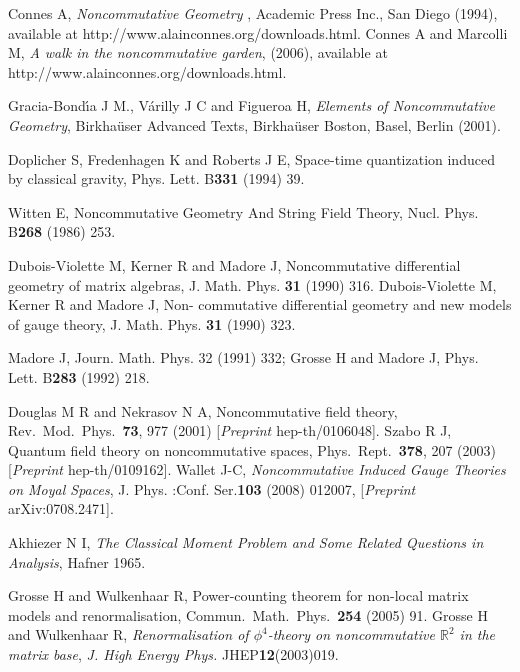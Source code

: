 \documentclass[a4paper,11pt,twoside]{article}
\numberwithin{equation}{section}
\theoremstyle{nonumberplain}
\begin{document}

\begin{thebibliography}{50} 

 Connes A, {\it{Noncommutative Geometry}} , Academic Press Inc., San Diego (1994), available at
http://www.alainconnes.org/downloads.html. Connes A and Marcolli M, {\it{A walk in the noncommutative garden}}, (2006), available at http://www.alainconnes.org/downloads.html.

 Gracia-Bond{\'\i}a J M., V{\'a}rilly J C and Figueroa H, {\it{Elements of Noncommutative Geometry}}, Birkha\"user Advanced Texts, Birkha\"user Boston, Basel, Berlin (2001).

 Doplicher S, Fredenhagen K and Roberts J E, {{Space-time quantization induced by classical gravity}}, Phys. Lett. B{\bf{331}} (1994) 39.

 Witten E, {{Noncommutative Geometry And String Field Theory}}, Nucl. Phys. B{\bf{268}} (1986) 253.

 Dubois-Violette M, Kerner R and Madore J, {{Noncommutative differential geometry of matrix
algebras}}, J. Math. Phys. {\bf{31}} (1990) 316. Dubois-Violette M, Kerner R and Madore J, {{Non-
commutative differential geometry and new models of gauge theory}}, J. Math. Phys. {\bf{31}} (1990)
323.

 Madore J, Journ. Math. Phys. 32 (1991) 332; Grosse H and Madore J, Phys. Lett. B{\bf{283}} (1992) 218.

Douglas M R and Nekrasov N A, {{Noncommutative field theory}}, Rev.\ Mod.\ Phys.\  {\bf 73}, 977 (2001) [{\it{Preprint }} hep-th/0106048]. Szabo R J, {{Quantum field theory on noncommutative spaces}}, Phys.\ Rept.\  {\bf 378}, 207 (2003) [{\it{Preprint }} hep-th/0109162]. Wallet J-C, {\it{Noncommutative Induced Gauge Theories on Moyal Spaces}}, J. Phys. :Conf. Ser.{\bf{103}} (2008) 012007, [{\it{Preprint }} arXiv:0708.2471]. 

 Akhiezer N I, {\it{The Classical Moment Problem and Some Related Questions in Analysis}}, Hafner 1965.

Grosse H and Wulkenhaar R, {{Power-counting theorem for non-local matrix models and renormalisation}}, Commun.\ Math.\ Phys.\  {\bf 254} (2005) 91. Grosse H and Wulkenhaar R, {\it{Renormalisation of $\phi^4$-theory on noncommutative $\mathbb{R}^2$ in the matrix base}}, {\it{J. High Energy Phys.}} JHEP{\bf 12}(2003)019. 


\end{thebibliography}
\end{document}
